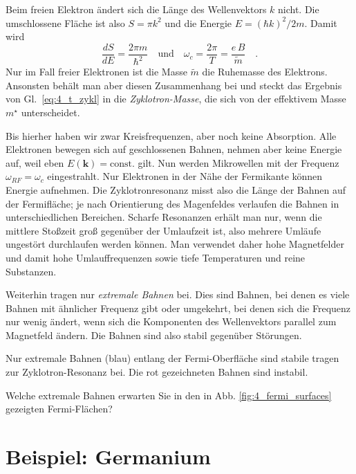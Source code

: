 Beim freien Elektron ändert sich die Länge des Wellenvektors $k$ nicht. Die umschlossene Fläche ist also $S = \pi k^2$ und die Energie $E = (\hbar k)^2 / 2m$. Damit wird 
\begin{equation}
   \frac{dS}{dE} = \frac{2 \pi m}{\hbar^2} \quad \text{und} \quad  \omega_c = \frac{2\pi}{T} =  \frac{e \, B }{\tilde{m}}  \quad .
 \end{equation}
Nur im Fall freier Elektronen ist die Masse $\tilde{m}$ die Ruhemasse des Elektrons. Ansonsten behält man aber diesen Zusammenhang bei und steckt das Ergebnis von Gl.~\ref{eq:4_t_zykl} in die 
 \emph{Zyklotron-Masse}, die sich von der effektivem Masse $m^\star$ unterscheidet.

 Bis hierher haben wir zwar Kreisfrequenzen, aber noch keine Absorption. Alle Elektronen bewegen sich auf geschlossenen Bahnen, nehmen aber keine Energie auf, weil eben $E (\mathbf{k}) = \text{const.}$ gilt. Nun werden Mikrowellen mit der Frequenz $\omega_{RF} = \omega_c$ eingestrahlt. Nur Elektronen in der Nähe der Fermikante können Energie aufnehmen. Die Zyklotronresonanz misst also die Länge der Bahnen auf der Fermifläche; je nach Orientierung des Magenfeldes verlaufen die Bahnen in unterschiedlichen Bereichen. Scharfe Resonanzen erhält man nur, wenn die mittlere Stoßzeit groß gegenüber der Umlaufzeit ist, also mehrere Umläufe ungestört durchlaufen werden können. Man verwendet daher hohe Magnetfelder und damit hohe Umlauffrequenzen sowie tiefe Temperaturen und reine Substanzen.

Weiterhin tragen nur \emph{extremale Bahnen} bei. Dies sind Bahnen, bei denen es viele Bahnen mit ähnlicher Frequenz gibt oder umgekehrt, bei denen sich die Frequenz nur wenig ändert, wenn sich die Komponenten des Wellenvektors parallel zum Magnetfeld ändern. Die Bahnen sind also stabil gegenüber Störungen.

\begin{marginfigure}
   \caption{Nur extremale Bahnen (blau) entlang der Fermi-Oberfläche sind stabile tragen zur Zyklotron-Resonanz bei. Die rot gezeichneten Bahnen sind instabil.}
\end{marginfigure}
 

\begin{questions}
   \item Welche extremale Bahnen erwarten Sie in den in Abb.  \ref{fig:4_fermi_surfaces} gezeigten Fermi-Flächen?  
\end{questions}

\section{Beispiel: Germanium}

